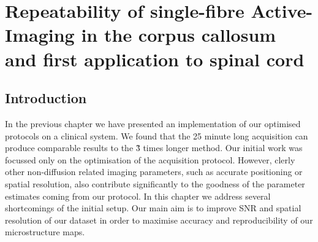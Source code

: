 
%

\newsavebox{\poorBox}
\savebox{\poorBox}{\textcolor{red}{\rule{0.05in}{0.05in}}}
\newsavebox{\fairBox}
\savebox{\fairBox}{\textcolor{orange}{\rule{0.05in}{0.05in}}}
\newsavebox{\moderateBox}
\savebox{\moderateBox}{\textcolor{yellow}{\rule{0.05in}{0.05in}}}
\newsavebox{\substantialBox}
\savebox{\substantialBox}{\textcolor{lime}{\rule{0.05in}{0.05in}}}
\newsavebox{\perfectBox}
\savebox{\perfectBox}{\textcolor{green}{\rule{0.05in}{0.05in}}}

\chapter{Repeatability of single-fibre Active-Imaging in the corpus callosum and first application to spinal cord}
\label{chapter9}
\section{Introduction}
In the previous chapter we have presented an implementation of our {\SFasym} optimised protocols on a clinical system. We found that the 25 minute long \SFasym{} acquisition can produce comparable results to the \~3 times longer \OI{} method. Our initial work was focussed only on the optimisation of the acquisition protocol. However, clerly other non-diffusion related imaging parameters, such as accurate positioning or spatial resolution, also contribute significantly to the goodness of the parameter estimates coming from our protocol. In this chapter we address several shortcomings of the initial \SFasym{} setup. Our main aim is to improve SNR and spatial resolution of our dataset in order to maximise accuracy and  reproducibility of our microstructure maps. 


